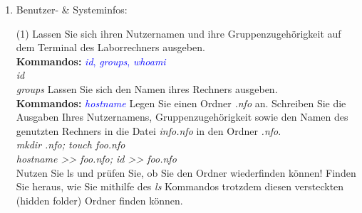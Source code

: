 \documentclass[paper=a4,fontsize=11pt]{scrartcl}%
\numberwithin{equation}{section}
\begin{document}
\begin{enumerate}
\begin{tasks}
		\task Navigieren Sie in Ihr Heimatverzeichnis. Legen Sie folgenden Ordner, sowie Unterordner mithilfe des \emph{mkdir}-Kommandos an: .\\
		\textit{mkdir -p exercise\_notes/tutorials}\\
		\task Kopieren Sie die Datei bzw. den Ordner \emph{shell\_tutorial} in das eben angelegte Verzeichnis.\\
		\textbf{Kommandos:} \textcolor{blue}{\emph{cp} }\\
		\textit{cp   }
        \task Kopieren Sie die Datei(en) inklusive des Ordners  in das Verzeichnis .\\
        \textbf{Hinweise:} Schauen Sie in die Manpage von cp um herauszufinden, wie Ordner kopiert werden können.\\
        \textbf{Kommandos:} \textcolor{blue}{\emph{man}}\\
        \textit{cp -r  }
        \end{tasks}
        \footnote{.md steht für Markdown, welches ein Format für Textdateien ist, ähnlich wie .pdf oder .doc-Dateien.}
        \footnote{\url{https://github.com/retext-project}}
         \footnote{Sie können auch mit vi, vim oder emacs arbeiten!}
  \item Benutzer- \& Systeminfos:
        \begin{tasks}(1)       
          \task Lassen Sie sich ihren Nutzernamen und ihre Gruppenzugehörigkeit auf dem Terminal des Laborrechners ausgeben. \\
          \textbf{Kommandos:} \textcolor{blue}{\emph{id}, \emph{groups}, \emph{whoami}}\\
          \textit{id}\\
          \textit{groups}
          \task Lassen Sie sich den Namen ihres Rechners ausgeben.\\
          \textbf{Kommandos:} \textcolor{blue}{\emph{hostname}}
          \task Legen Sie einen Ordner \emph{.nfo} an. Schreiben Sie die Ausgaben Ihres Nutzernamens, Gruppenzugehörigkeit sowie den Namen des genutzten Rechners in die Datei \emph{info.nfo} in den Ordner \emph{.nfo}.\\
          \textit{mkdir .nfo; touch foo.nfo}\\
          \textit{hostname >> foo.nfo; id >> foo.nfo}\\
          \task Nutzen Sie ls und prüfen Sie, ob Sie den Ordner wiederfinden können! Finden Sie heraus, wie Sie mithilfe des \emph{ls} Kommandos trotzdem diesen versteckten (hidden folder) Ordner finden können. \\

\end{tasks}
\end{enumerate}
\end{document}

